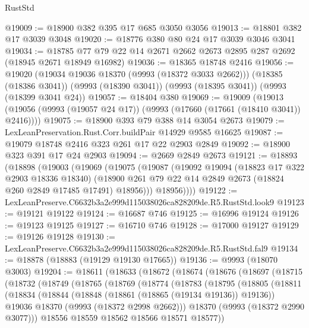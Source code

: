 \begin{lexlean}{RustStd}
\begin{coremodule}
@19009 := @18900 @382 @395 @17 @685 @3050 @3056
@19013 := @18801 @382 @17 @3039 @3048
@19020 := @18776 @380 @80 @24 @17 @3039 @3046 @3041
@19034 := @18785 @77 @79 @22 @14 @2671 @2662 @2673 @2895 @287 @2692 (@18945 @2671 @18949 @16982)
@19036 := @18365 @18748 @2416
@19056 := @19020
    (@19034 @19036 @18370 (@9993 (@18372 @3033 @2662)))
    (@18385 (@18386 @3041))
    (@9993 (@18390 @3041))
    (@9993 (@18395 @3041))
    (@9993 (@18399 @3041 @24))
@19057 := @18404 @380
@19069 := @19009
    (@19013 (@19056 (@9993 (@19057 @24 @17)) (@9993 (@17660 (@17661 (@18410 @3041)) @2416))))
@19075 := @18900 @393 @79 @388 @14 @3054 @2673
@19079 := LexLeanPreservation.Rust.Corr.buildPair @14929 @9585 @16625
@19087 := @19079 @18748 @2416 @323 @261 @17 @22 @2903 @2849
@19092 := @18900 @323 @391 @17 @24 @2903
@19094 := @2669 @2849 @2673
@19121 := @18893
    (@18898
      (@19003
        (@19069
          (@19075
            (@19087
              (@19092
                @19094
                (@18823 @17 @322 @2903 @18336 @18340)
                (@18900 @261 @79 @22 @14 @2849 @2673 (@18824 @260 @2849 @17485 @17491) @18956)))
            @18956))))
@19122 := LexLeanPreserve.C6632b3a2e999d115038026ca828209de.R5.RustStd.look9
@19123 := @19121 @19122
@19124 := @16687 @746
@19125 := @16996 @19124
@19126 := @19123 @19125
@19127 := @16710 @746
@19128 := @17000 @19127
@19129 := @19126 @19128
@19130 := LexLeanPreserve.C6632b3a2e999d115038026ca828209de.R5.RustStd.fal9
@19134 := @18878 (@18883 (@19129 @19130 @17665))
@19136 := @9993 (@18070 @3003)
@19204 := @18611
    (@18633
      (@18672
        (@18674
          (@18676
            (@18697
              (@18715
                (@18732
                  (@18749
                    (@18765
                      (@18769
                        (@18774
                          (@18783
                            (@18795
                              (@18805
                                (@18811
                                  (@18834
                                    (@18844
                                      (@18848 (@18861 (@18865 (@19134 @19136)) @19136))
                                      @19036
                                      @18370
                                      (@9993 (@18372 @2998 @2662)))
                                    @18370
                                    (@9993 (@18372 @2990 @3077)))
                                  @18556
                                  @18559
                                  @18562
                                  @18566
                                  @18571
                                  @18577))

\end{coremodule}
\end{lexlean}
